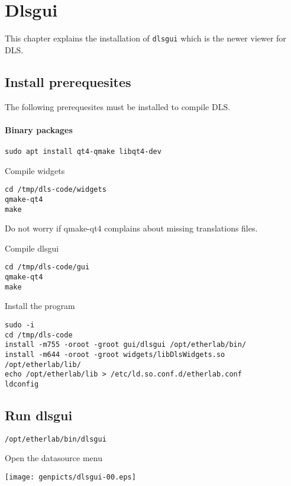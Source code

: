 \chapter{Dlsgui}

\label{chap:dlsgui}
This chapter explains the installation of \texttt{dlsgui} which is the
newer viewer for DLS.

\section{Install prerequesites}

The following prerequesites must be installed to compile DLS.

\subsubsection{Binary packages}
\begin{verbatim}
sudo apt install qt4-qmake libqt4-dev
\end{verbatim}

\noindent Compile widgets

\begin{verbatim}
cd /tmp/dls-code/widgets
qmake-qt4
make
\end{verbatim}

\noindent  Do not worry if qmake-qt4 complains about missing
translations files.

\noindent Compile dlsgui
\begin{verbatim}
cd /tmp/dls-code/gui
qmake-qt4
make
\end{verbatim}

\noindent Install the program

\begin{verbatim}
sudo -i
cd /tmp/dls-code
install -m755 -oroot -groot gui/dlsgui /opt/etherlab/bin/
install -m644 -oroot -groot widgets/libDlsWidgets.so  /opt/etherlab/lib/
echo /opt/etherlab/lib > /etc/ld.so.conf.d/etherlab.conf
ldconfig
\end{verbatim}



\section{Run dlsgui}


\begin{verbatim}
/opt/etherlab/bin/dlsgui
\end{verbatim}

\noindent Open the datasource menu
\begin{center}
\texttt{[image: genpicts/dlsgui-00.eps]}
\end{center}

